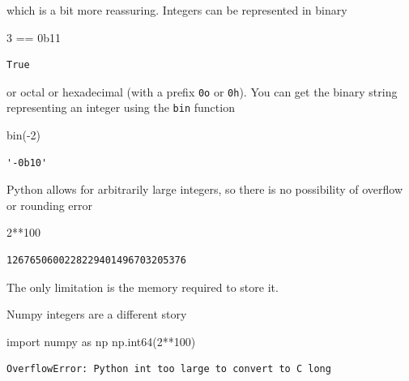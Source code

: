 \documentclass[
  letterpaper,
  DIV=11,
  numbers=noendperiod]{scrreprt}
\newenvironment{Shaded}{\begin{snugshade}}{\end{snugshade}}
\newcommand{\BaseNTok}[1]{\textcolor[rgb]{0.68,0.00,0.00}{#1}}
\newcommand{\BuiltInTok}[1]{\textcolor[rgb]{0.00,0.23,0.31}{#1}}
\newcommand{\DecValTok}[1]{\textcolor[rgb]{0.68,0.00,0.00}{#1}}
\newcommand{\ImportTok}[1]{\textcolor[rgb]{0.00,0.46,0.62}{#1}}
\newcommand{\NormalTok}[1]{\textcolor[rgb]{0.00,0.23,0.31}{#1}}
\newcommand{\OperatorTok}[1]{\textcolor[rgb]{0.37,0.37,0.37}{#1}}
\theoremstyle{definition}
\theoremstyle{remark}
\begin{document}
which is a bit more reassuring. Integers can be represented in binary

\begin{Shaded}
\begin{Highlighting}[]
\DecValTok{3} \OperatorTok{==} \BaseNTok{0b11}
\end{Highlighting}
\end{Shaded}

\begin{verbatim}
True
\end{verbatim}

or octal or hexadecimal (with a prefix \texttt{0o} or \texttt{0h}). You
can get the binary string representing an integer using the \texttt{bin}
function

\begin{Shaded}
\begin{Highlighting}[]
\BuiltInTok{bin}\NormalTok{(}\OperatorTok{{-}}\DecValTok{2}\NormalTok{)}
\end{Highlighting}
\end{Shaded}

\begin{verbatim}
'-0b10'
\end{verbatim}

Python allows for arbitrarily large integers, so there is no possibility
of overflow or rounding error

\begin{Shaded}
\begin{Highlighting}[]
\DecValTok{2}\OperatorTok{**}\DecValTok{100}
\end{Highlighting}
\end{Shaded}

\begin{verbatim}
1267650600228229401496703205376
\end{verbatim}

The only limitation is the memory required to store it.

Numpy integers are a different story

\begin{Shaded}
\begin{Highlighting}[]
\ImportTok{import}\NormalTok{ numpy }\ImportTok{as}\NormalTok{ np}
\NormalTok{np.int64(}\DecValTok{2}\OperatorTok{**}\DecValTok{100}\NormalTok{)}
\end{Highlighting}
\end{Shaded}

\begin{verbatim}
OverflowError: Python int too large to convert to C long
\end{verbatim}
\end{document}
